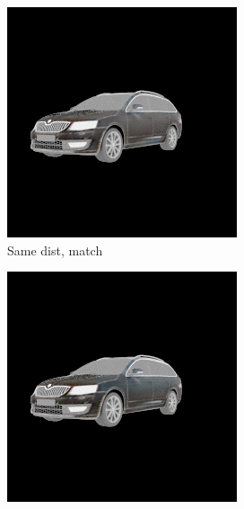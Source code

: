 \begin{figure}
\begin{subfigure}[t]{0.24\linewidth}
       \includegraphics[width=\linewidth]{graphics/results_3_model.png}
        \caption{Same dist, match}
    \end{subfigure}
    \begin{subfigure}[t]{0.24\linewidth}
        \centering
        \includegraphics[width=\linewidth]{graphics/envmap_sim.png}

\end{subfigure}
\end{figure}
